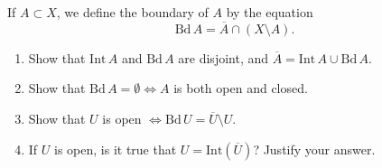 \documentclass[
]{book}
\providecommand{\tightlist}{%
  \setlength{\itemsep}{0pt}\setlength{\parskip}{0pt}}
\theoremstyle{definition}
\theoremstyle{definition}
\theoremstyle{definition}
\theoremstyle{definition}
\theoremstyle{remark}
\begin{document}
If \(A \subset X\), we define the boundary of \(A\) by the equation
\[\text{Bd} \, A = \overline{A} \cap (X \setminus A).\]

\begin{enumerate}
\def\labelenumi{(\alph{enumi})}
\tightlist
\item
  Show that \(\text{Int} \, A\) and \(\text{Bd} \, A\) are disjoint, and \(\overline{A} = \text{Int} \, A \cup \text{Bd} \, A\).
\item
  Show that \(\text{Bd} \, A = \emptyset \Leftrightarrow A\) is both open and closed.
\item
  Show that \(U\) is open \(\Leftrightarrow \text{Bd} \, U = \overline{U} \setminus U\).
\item
  If \(U\) is open, is it true that \(U = \text{Int}(\overline{U})\)? Justify your answer.
\end{enumerate}

  
\end{document}
